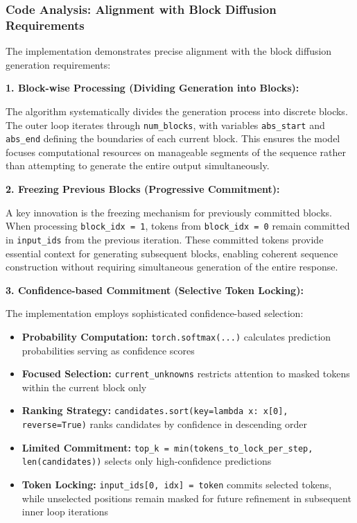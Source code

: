 \documentclass[a4paper,12pt]{article}
\begin{document}
\subsubsection*{Code Analysis: Alignment with Block Diffusion Requirements}

The implementation demonstrates precise alignment with the block diffusion generation requirements:

\textbf{1. Block-wise Processing (Dividing Generation into Blocks):}

The algorithm systematically divides the generation process into discrete blocks. The outer loop iterates through \texttt{num\_blocks}, with variables \texttt{abs\_start} and \texttt{abs\_end} defining the boundaries of each current block. This ensures the model focuses computational resources on manageable segments of the sequence rather than attempting to generate the entire output simultaneously.

\textbf{2. Freezing Previous Blocks (Progressive Commitment):}

A key innovation is the freezing mechanism for previously committed blocks. When processing \texttt{block\_idx = 1}, tokens from \texttt{block\_idx = 0} remain committed in \texttt{input\_ids} from the previous iteration. These committed tokens provide essential context for generating subsequent blocks, enabling coherent sequence construction without requiring simultaneous generation of the entire response.

\textbf{3. Confidence-based Commitment (Selective Token Locking):}

The implementation employs sophisticated confidence-based selection:

\begin{itemize}
    \item \textbf{Probability Computation:} \texttt{torch.softmax(...)} calculates prediction probabilities serving as confidence scores
    \item \textbf{Focused Selection:} \texttt{current\_unknowns} restricts attention to masked tokens within the current block only
    \item \textbf{Ranking Strategy:} \texttt{candidates.sort(key=lambda x: x[0], reverse=True)} ranks candidates by confidence in descending order
    \item \textbf{Limited Commitment:} \texttt{top\_k = min(tokens\_to\_lock\_per\_step, len(candidates))} selects only high-confidence predictions
    \item \textbf{Token Locking:} \texttt{input\_ids[0, idx] = token} commits selected tokens, while unselected positions remain masked for future refinement in subsequent inner loop iterations
\end{itemize}
\end{document}
